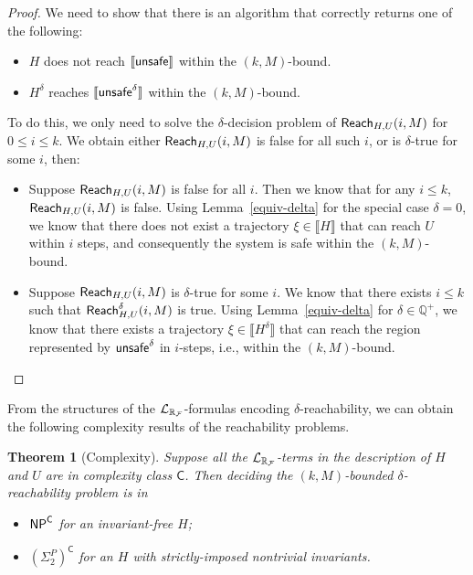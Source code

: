 \documentclass[journal]{IEEEtran}
\newtheorem{theorem}{Theorem}
\begin{document}
\begin{proof}
We need to show that there is an algorithm that correctly returns one of the following:
\begin{itemize}
\item $H$ does not reach $\llbracket\mathsf{unsafe}\rrbracket$ within the $(k,M)$-bound.
\item $H^{\delta}$ reaches $\llbracket\mathsf{unsafe}^{\delta}\rrbracket$ within the $(k,M)$-bound.
\end{itemize}
To do this, we only need to solve the $\delta$-decision problem of $\mathsf{Reach}_{H,U}(i,M)$ for $0\leq i\leq k$. We obtain either $\mathsf{Reach}_{H,U}(i,M)$ is false for all such $i$, or is $\delta$-true for some $i$, then:
\begin{itemize}
\item Suppose $\mathsf{Reach}_{H,U}(i,M)$ is false for all $i$. Then we know that for any $i\leq k$, $\mathsf{Reach}_{H,U}(i,M)$ is false. Using Lemma~\ref{equiv-delta} for the special case $\delta=0$, we know that there does not exist a trajectory $\xi\in\llbracket H\rrbracket$ that can reach $U$ within $i$ steps, and consequently the system is safe within the $(k,M)$-bound.
\item Suppose $\mathsf{Reach}_{H,U}(i,M)$ is $\delta$-true for some $i$. We know that there exists $i\leq k$ such that $\mathsf{Reach}^{\delta}_{H,U}(i,M)$ is true. Using Lemma~\ref{equiv-delta} for $\delta\in\mathbb{Q}^+$, we know that there exists a trajectory $\xi\in\llbracket H^{\delta}\rrbracket$ that can reach the region represented by $\mathsf{unsafe}^{\delta}$ in $i$-steps, i.e., within the $(k,M)$-bound.
\end{itemize}
\end{proof}
From the structures of the $\mathcal{L}_{\mathbb{R}_{\mathcal{F}}}$-formulas encoding $\delta$-reachability, we can obtain the following complexity results of the reachability problems.
\begin{theorem}[Complexity]
Suppose all the $\mathcal{L}_{\mathbb{R}_{\mathcal{F}}}$-terms in the description of $H$ and $U$ are in complexity class $\mathsf{C}$. Then deciding the $(k,M)$-bounded $\delta$-reachability problem is in
\begin{itemize}
\item $\mathsf{NP}^{\mathsf{C}}$ for an invariant-free $H$;
\item $(\Sigma_2^P)^{\mathsf{C}}$ for an $H$ with strictly-imposed nontrivial invariants.
\end{itemize}
\end{theorem}
\end{document}
